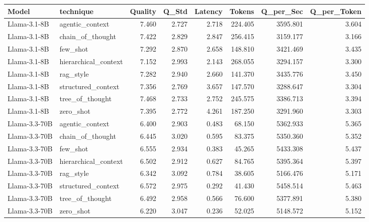 \begin{tabular}{llrrrrrr}
\toprule
Model & technique & Quality & Q_Std & Latency & Tokens & Q_per_Sec & Q_per_Token \\
\midrule
Llama-3.1-8B & agentic_context & 7.460 & 2.727 & 2.718 & 224.405 & 3595.801 & 3.604 \\
Llama-3.1-8B & chain_of_thought & 7.422 & 2.829 & 2.847 & 256.415 & 3159.177 & 3.166 \\
Llama-3.1-8B & few_shot & 7.292 & 2.870 & 2.658 & 148.810 & 3421.469 & 3.435 \\
Llama-3.1-8B & hierarchical_context & 7.152 & 2.993 & 2.143 & 268.055 & 3294.157 & 3.300 \\
Llama-3.1-8B & rag_style & 7.282 & 2.940 & 2.660 & 141.370 & 3435.776 & 3.450 \\
Llama-3.1-8B & structured_context & 7.356 & 2.769 & 3.657 & 147.570 & 3288.647 & 3.304 \\
Llama-3.1-8B & tree_of_thought & 7.468 & 2.733 & 2.752 & 245.575 & 3386.713 & 3.394 \\
Llama-3.1-8B & zero_shot & 7.395 & 2.772 & 4.261 & 187.250 & 3291.960 & 3.303 \\
Llama-3.3-70B & agentic_context & 6.400 & 2.903 & 0.483 & 68.150 & 5362.933 & 5.365 \\
Llama-3.3-70B & chain_of_thought & 6.445 & 3.020 & 0.595 & 83.375 & 5350.360 & 5.352 \\
Llama-3.3-70B & few_shot & 6.555 & 2.934 & 0.383 & 45.265 & 5433.308 & 5.437 \\
Llama-3.3-70B & hierarchical_context & 6.502 & 2.912 & 0.627 & 84.765 & 5395.364 & 5.397 \\
Llama-3.3-70B & rag_style & 6.342 & 3.092 & 0.784 & 38.605 & 5166.476 & 5.171 \\
Llama-3.3-70B & structured_context & 6.572 & 2.975 & 0.292 & 41.430 & 5458.514 & 5.463 \\
Llama-3.3-70B & tree_of_thought & 6.492 & 2.958 & 0.566 & 76.600 & 5377.891 & 5.380 \\
Llama-3.3-70B & zero_shot & 6.220 & 3.047 & 0.236 & 52.025 & 5148.572 & 5.152 \\
\bottomrule
\end{tabular}
